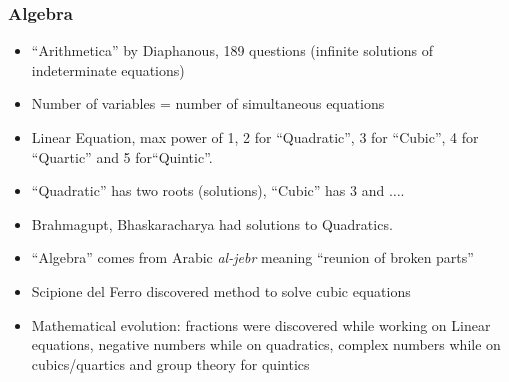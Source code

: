 \begin{frame}[fragile]
\begin{itemize}[label=\textbullet,noitemsep,nolistsep]
\end{itemize}
\end{frame}


\begin{frame}[fragile]
\frametitle{Algebra}
\begin{itemize}[label=\textbullet, noitemsep,nolistsep]
\item ``Arithmetica'' by Diaphanous, 189 questions (infinite solutions of indeterminate equations)
\item Number of variables = number of simultaneous equations
\item Linear Equation, max power of 1, 2 for ``Quadratic'', 3  for ``Cubic'', 4 for ``Quartic'' and 5 for``Quintic''.
\item ``Quadratic'' has two roots (solutions), ``Cubic'' has 3 and $\dots$.
\item Brahmagupt, Bhaskaracharya had solutions to Quadratics.
\item ``Algebra'' comes from Arabic {\it al-jebr} meaning ``reunion of broken parts''
\item Scipione del Ferro discovered method to solve cubic equations
\item Mathematical evolution: fractions were discovered while working on Linear equations, negative numbers while on quadratics, complex numbers while on cubics/quartics and group theory for quintics
\end{itemize}
\end{frame}

